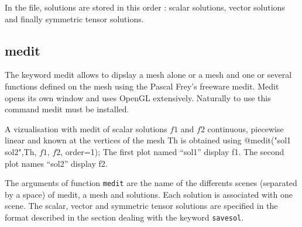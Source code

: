 \documentclass[a4paper,twoside,12pt]{book}
\begin{document}

In the file, solutions are stored in this order : scalar solutions, vector solutions and finally symmetric
tensor solutions.

\subsection{medit}

The keyword medit allows to dipslay a mesh alone or a mesh and one or several functions defined on the mesh using the Pascal Frey's freeware medit.
Medit opens its own window and uses OpenGL extensively.
Naturally to use this command  medit must be installed.

A vizualisation with medit of scalar solutions $f1$ and $f2$ continuous, piecewise linear and known at the vertices of the mesh Th is obtained using
\bFF
@medit("sol1 sol2",Th, $f1$, $f2$, order=1);
\eFF
The first plot  named ``sol1'' display f1. The second plot names ``sol2'' display f2.

The arguments of function \texttt{medit} are the name of the differents scenes (separated by a space) of medit, a mesh and solutions.
Each solution is associated with one scene. The scalar, vector and symmetric tensor solutions are specified in the format described in the section dealing with the keyword \texttt{savesol}.
\end{document}
